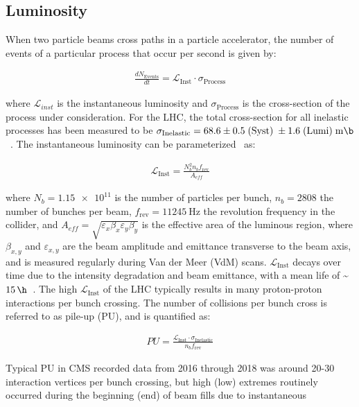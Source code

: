 \subsection{Luminosity}
When two particle beams cross paths in a particle accelerator, the number of events of a particular process that occur per second is given by:
\begin{linenomath*}
\begin{align}
{\frac{dN_{\text {Events}}}{dt}}= \mathcal{L}_{\text{Inst}} \cdot \sigma_{\text{Process}}
\end{align}
\end{linenomath*}
where $\mathcal{L}_{inst}$ is the instantaneous luminosity and $\sigma_{\text{Process}}$ is the cross-section of the process under consideration.
For the \beamenergy LHC, the total cross-section for all inelastic processes has been measured to be $\sigma_{\text{Inelastic}} = 68.6 \pm 0.5 \; (\text{Syst}) \; \pm 1.6 \; (\text{Lumi}) \; \si{\milli \b}$~\cite{inelasticprotonprotoncrosssection}.
The instantaneous luminosity can be parameterized~\cite{Karacheban:2294183} as:
\begin{linenomath*}
\begin{align}
\mathcal{L}_{\text{Inst}}=\frac{N_b^2 n_b f_{\mathrm{rev}}}{A_{eff}}
\end{align}
\end{linenomath*}
where $N_b = \num{1.15e11}$ is the number of particles per bunch, $n_b=2808$ the number of bunches per beam, $f_{\mathrm{rev}} = \SI{11245}{\Hz}$ the revolution frequency in the collider, and $A_{eff} = \sqrt{\varepsilon_x \beta_x \varepsilon_y \beta_y}$ is the effective area of the luminous region, where $\beta_{x,y}$ and $\varepsilon_{x,y}$ are the beam amplitude and emittance transverse to the beam axis, and is measured regularly during Van der Meer (VdM) scans.
$\mathcal{L}_{\text{Inst}}$ decays over time due to the intensity degradation and beam emittance, with a mean life of \sim$\SI{15}{\h}$~\cite{LyndonEvans_2008}.
The high $\mathcal{L}_{\text{Inst}}$ of the LHC typically results in many proton-proton interactions per bunch crossing.
The number of collisions per bunch cross is referred to as pile-up (PU), and is quantified as:
\begin{linenomath*}
\begin{align}
PU = \frac{\mathcal{L}_{\text{Inst}} \cdot \sigma_{\text{Inelastic}}}{n_b f_{\mathrm{rev}}}
\end{align}
\end{linenomath*}
Typical PU in CMS recorded data from 2016 through 2018 was around 20-30 interaction vertices per bunch crossing, but high (low) extremes routinely occurred during the beginning (end) of beam fills due to instantaneous 
